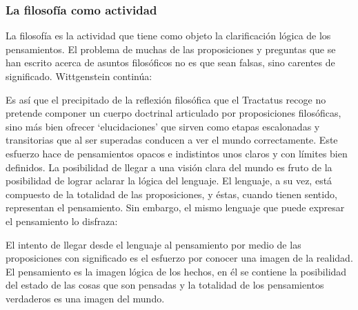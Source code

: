 \subsubsection{La filosofía como actividad}

La filosofía es la actividad que tiene como objeto la clarificación lógica
de los pensamientos.\autocite[4.112 p. 52]{wittgenstein1922tractatus} El problema de muchas de
las proposiciones y preguntas que se han escrito acerca de asuntos filosóficos
no es que sean falsas, sino carentes de significado. Wittgenstein continúa:

Es así que el precipitado de la reflexión filosófica que el Tractatus recoge no
pretende componer un cuerpo doctrinal articulado por proposiciones filosóficas,
sino más bien ofrecer `elucidaciones' que sirven como etapas escalonadas y
transitorias que al ser superadas conducen a ver el mundo correctamente. Este
esfuerzo hace de pensamientos opacos e indistintos unos claros y con límites
bien definidos.\autocite[cf. 4.112 y 6.54]{wittgenstein1922tractatus}
La posibilidad de llegar a una visión clara del mundo es fruto de la posibilidad
de lograr aclarar la lógica del lenguaje. El lenguaje, a su vez, está compuesto
de la totalidad de las proposiciones, y éstas, cuando tienen sentido,
representan el pensamiento.\autocite[cf. 4 y 4.001]{wittgenstein1922tractatus}
Sin embargo, el mismo lenguaje que puede expresar el pensamiento lo disfraza:


El intento de llegar desde el lenguaje al pensamiento por medio de las
proposiciones con significado es el esfuerzo por conocer una imagen de la
realidad. El pensamiento es la imagen lógica de los hechos, en él se contiene la
posibilidad del estado de las cosas que son pensadas y la totalidad de los
pensamientos verdaderos es una imagen del mundo.\autocite[cf.][3 y
3.001]{wittgenstein1922tractatus}

